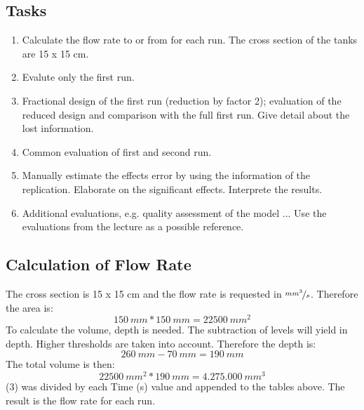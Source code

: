 \subsection{Tasks}
\begin{enumerate}
\item Calculate the flow rate to or from  for each run. The cross section of the tanks are 15 x 15 cm.
\item Evalute only the first run.
\item Fractional design of the first run (reduction by factor 2); evaluation of the reduced design and comparison with the full first run. Give detail about the lost information.
\item Common evaluation of first and second run.
\item Manually estimate the effects error by using the information of the replication. Elaborate on the significant effects. Interprete the results.
\item Additional evaluations, e.g. quality assessment of the model ... Use the evaluations from the lecture as a possible reference.
\end{enumerate}

\subsection{Calculation of Flow Rate}
The cross section is 15 x 15 cm and the flow rate is requested in $\nicefrac{mm^3}{s}$. Therefore the area is:
\begin{equation}
150\:mm * 150\:mm = 22500\:mm^2
\end{equation}
To calculate the volume, depth is needed. The subtraction of levels will yield in depth. Higher thresholds are taken into account. Therefore the depth is:
\begin{equation}
260\:mm - 70\:mm = 190\:mm
\end{equation}
The total volume is then:
\begin{equation}
22500\:mm^2 * 190\:mm = 4.275.000\:mm^3
\end{equation}
(3) was divided by each Time (s) value and appended to the tables above. The result is the flow rate for each run.

